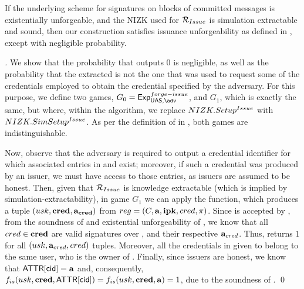 \begin{theorem}
  \label{thm:issue-forge-uas}
  If the underlying scheme for signatures on blocks of committed messages is
  existentially unforgeable, and the NIZK used for $\mathcal{R}_{Issue}$ is
  simulation extractable and sound, then our \CUASGen construction satisfies
  issuance unforgeability as defined in , except
  with negligible probability.
\end{theorem}


\begin{proof}[]
  We show that the probability that \fissue outputs $0$ is negligible, as well
  as the probability that the extracted \usk is not the one that was used to
  request some of the credentials employed to obtain the credential specified by
  the adversary.
  For this purpose, we define two games, $G_0=\ExpForgeIssue$, and $G_1$, which
  is exactly the same, but where, within the \Setup algorithm, we replace
  $NIZK.Setup^{Issue}$ with $NIZK.SimSetup^{Issue}$. As per the definition of
  \NIZK in , both games are indistinguishable.

  Now, observe that the adversary is required to output a credential
  identifier for which associated entries in \trans and \CRED exist; moreover,
  if such a credential was produced by an issuer, we must have access to those
  entries, as issuers are assumed to be honest.
  Then, given that $\mathcal{R}_{Issue}$ is knowledge extractable (which is implied
  by simulation-extractability), in game $G_1$
  we can apply the \NIZKExtract function, which produces a tuple $(usk,\mathbf{cred},
  \mathbf{a}_{\mathbf{cred}})$ from $reg = (C,\mathbf{a},\mathbf{ipk},cred,\pi)$.
  Since \NIZKproof is accepted by \ExtractIssue, from the soundness of \NIZK and
  existential unforgeability of \SBCM, we know that all $cred \in \mathbf{cred}$ are
  valid signatures over \usk, and their respective $\mathbf{a}_{cred}$. Thus,
  \Identify returns $1$ for all $(usk,\mathbf{a}_{cred},cred)$ tuples.
  Moreover, all the credentials in \scred given to \fissue belong to the same
  user, who is the owner of \usk.
  Finally, since issuers are honest, we know that $\mathsf{ATTR}[\mathsf{cid}] = \mathbf{a}$ and,
  consequently, $f_{is}(usk,\mathbf{cred},\mathsf{ATTR}[\mathsf{cid}]) = f_{is}(usk,\mathbf{cred},\mathbf{a})
  = 1$, due to the soundness of \NIZK.
  \qed
\end{proof}

